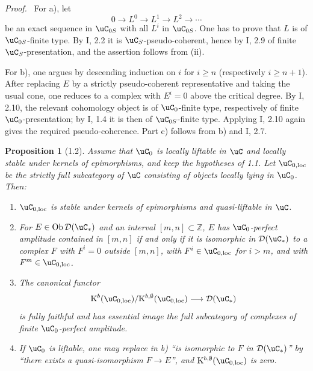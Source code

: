 \documentclass[11pt]{article}
\theoremstyle{plain}
\newtheorem*{proposition*}{Proposition}
\theoremstyle{definition}
\theoremstyle{remark}
\newenvironment{prooftext}{\par\noindent\textit{Proof.}\ }{\par\medskip}
\newcommand{\ZZ}{\mathbb Z}
\newcommand{\D}{\mathcal D}\newcommand{\E}{\mathcal E}\newcommand{\F}{\mathcal F}
\DeclareMathOperator{\ob}{Ob}
\providecommand{\K}{\mathrm K}
\begin{document}
\begin{prooftext}
For a), let
\[
0\longrightarrow L^0\longrightarrow L^1\longrightarrow L^2\longrightarrow\cdots
\]
be an exact sequence in $\uC_{0S}$ with all $L^i$ in $\uC_{0S}$. One has to prove that $L$ is of $\uC_{0S}$-finite type. By I, 2.2 it is $\uC_S$-pseudo-coherent, hence by I, 2.9 of finite $\uC_S$-presentation, and the assertion follows from (ii).

For b), one argues by descending induction on $i$ for $i\ge n$ (respectively $i\ge n+1$). After replacing $E$ by a strictly pseudo-coherent representative and taking the usual cone, one reduces to a complex with $E^i=0$ above the critical degree. By I, 2.10, the relevant cohomology object is of $\uC_0$-finite type, respectively of finite $\uC_0$-presentation; by I, 1.4 it is then of $\uC_{0S}$-finite type. Applying I, 2.10 again gives the required pseudo-coherence. Part c) follows from b) and I, 2.7.
\end{prooftext}

\begin{proposition*}[1.2]
Assume that $\uC_0$ is locally liftable in $\uC$ and locally stable under kernels of epimorphisms, and keep the hypotheses of 1.1. Let $\uC_{0,\mathrm{loc}}$ be the strictly full subcategory of $\uC$ consisting of objects locally lying in $\uC_0$. Then:
\begin{enumerate}[label=\alph*)]
\item $\uC_{0,\mathrm{loc}}$ is stable under kernels of epimorphisms and quasi-liftable in $\uC$.
\item For $E\in\ob\D(\uC_*)$ and an interval $[m,n]\subset\ZZ$, $E$ has $\uC_0$-perfect amplitude contained in $[m,n]$ if and only if it is isomorphic in $\D(\uC_*)$ to a complex $F$ with $F^i=0$ outside $[m,n]$, with $F^i\in\uC_{0,\mathrm{loc}}$ for $i>m$, and with $F^m\in\uC_{0,\mathrm{loc}}$.
\item The canonical functor
\[
\K^b(\uC_{0,\mathrm{loc}})/\K^{b,\emptyset}(\uC_{0,\mathrm{loc}})
\longrightarrow \D(\uC_*)
\]
is fully faithful and has essential image the full subcategory of complexes of finite $\uC_0$-perfect amplitude.
\item If $\uC_0$ is liftable, one may replace in b) ``is isomorphic to $F$ in $\D(\uC_*)$'' by ``there exists a quasi-isomorphism $F\to E$'', and $\K^{b,\emptyset}(\uC_{0,\mathrm{loc}})$ is zero.
\end{enumerate}
\end{proposition*}
\end{document}
